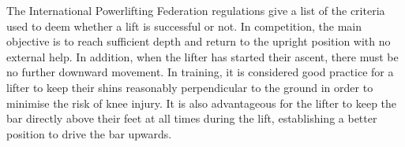 The International Powerlifting Federation regulations\cite{ipf} give a list of the criteria used to deem whether a lift is successful or not. In competition, the main objective is to reach sufficient depth and return to the upright position with no external help. In addition, when the lifter has started their ascent, there must be no further downward movement. In training, it is considered good practice for a lifter to keep their shins reasonably perpendicular to the ground in order to minimise the risk of knee injury. It is also advantageous for the lifter to keep the bar directly above their feet at all times during the lift, establishing a better position to drive the bar upwards.